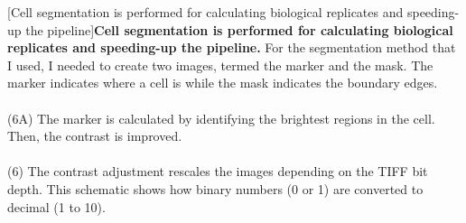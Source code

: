 \begin{centering}
\captionsetup{parbox=none}
[Cell segmentation is performed for calculating biological replicates and speeding-up the pipeline]{\textbf{Cell segmentation is performed for calculating biological replicates and speeding-up the pipeline.} For the segmentation method that I used, I needed to create two images, termed the marker and the mask. The marker indicates where a cell is while the mask indicates the boundary edges.
\\
\\
(6A) The marker is calculated by identifying the brightest regions in the cell. Then, the contrast is improved.
\\
\\
(6) The contrast adjustment rescales the images depending on the TIFF bit depth. This schematic shows how binary numbers (0 or 1) are converted to decimal (1 to 10).
\\
\\
}
\end{centering}
